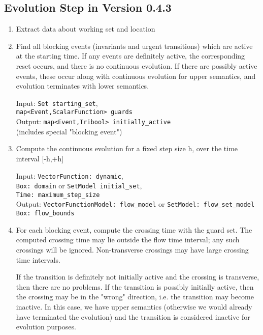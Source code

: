 \documentclass[english,a4paper]{article}
\theoremstyle{theorem}
\theoremstyle{definition}
\theoremstyle{remark}
\begin{document}
\subsection*{Evolution Step in Version 0.4.3}

\begin{enumerate}
\item Extract data about working set and location

\item Find all blocking events (invariants and urgent transitions) which are
active at the starting time. If any events are definitely active,
the corresponding reset occurs, and there is no continuous evolution.
If there are possibly active events, these occur along with continuous
evolution for upper semantics, and evolution terminates with lower
semantics.

\begin{tabbing}
Input: \= \texttt{Set starting\_set},\\
       \> \texttt{map<Event,ScalarFunction> guards}\\
Output: \= \texttt{map<Event,Tribool> initially\_active}\\
     \> \qquad (includes special "blocking event")
\end{tabbing}

\item Compute the continuous evolution for a fixed step size h, over the
time interval [-h,+h]

\begin{tabbing}
Input: \=\texttt{VectorFunction:\ dynamic},\\
       \>\texttt{Box:\ domain} or  \texttt{SetModel\ initial\_set},\\
       \>\texttt{Time:\ maximum\_step\_size}\\
Output: \=
        \texttt{VectorFunctionModel:\ flow\_model}
           or \texttt{SetModel:\ flow\_set\_model}\\
        \> \texttt{Box:\ flow\_bounds}\\
\end{tabbing}


\item For each blocking event, compute the crossing time with the guard set.
The computed crossing time may lie outside the flow time interval;
any such crossings will be ignored. Non-transverse crossings may have
large crossing time intervals.

If the transition is definitely not initially active and the crossing
is transverse, then there are no problems. If the transition is
possibly initially active, then the crossing may be in the "wrong"
direction, i.e. the transition may become inactive. In this case, we
have upper semantics (otherwise we would already have terminated the
evolution) and the transition is considered inactive for evolution
purposes.


\end{enumerate}
\end{document}
